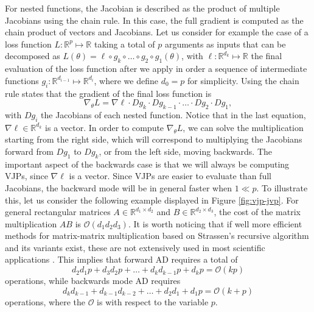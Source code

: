 For nested functions, the Jacobian is described as the product of multiple Jacobians using the chain rule.
In this case, the full gradient is computed as the chain product of vectors and Jacobians. 
Let us consider for example the case of a loss function $L : \mathbb R^p \mapsto \mathbb R$ taking a total of $p$ arguments as inputs that can be decomposed as $L(\theta) = \ell \circ g_{k} \circ \ldots \circ g_2 \circ g_1(\theta)$, with $\ell : \mathbb R^{d_k} \mapsto \mathbb R$ the final evaluation of the loss function after we apply in order a sequence of intermediate functions $g_i : \mathbb R^{d_{i-1}} \mapsto \mathbb R^{d_i}$, where we define $d_0 = p$ for simplicity. 
Using the chain rule states that the gradient of the final loss function is
\begin{equation}
 \nabla_\theta L = \nabla \ell \cdot Dg_{k} \cdot Dg_{k-1} \cdot \ldots \cdot Dg_2 \cdot Dg_1, 
\end{equation}
with $Dg_i$ the Jacobians of each nested function. 
Notice that in the last equation, $\nabla \ell \in \mathbb R^{d_k}$ is a vector.
In order to compute $\nabla_\theta L$, we can solve the multiplication starting from the right side, which will correspond to multiplying the Jacobians forward from $Dg_1$ to $Dg_k$, or from the left side, moving backwards. 
The important aspect of the backwards case is that we will always be computing VJPs, since $\nabla \ell$ is a vector.
Since VJPs are easier to evaluate than full Jacobians, the backward mode will be in general faster when $1 \ll p$.
To illustrate this, let us consider the following example displayed in Figure \ref{fig:vjp-jvp}. 
For general rectangular matrices $A\in \mathbb R^{d_1 \times d_2}$ and $B \in \mathbb R^{d_2 \times d_3}$, the cost of the matrix multiplication $AB$ is $\mathcal O (d_1 d_2 d_3)$.
It is worth noticing that if well more efficient methods for matrix-matrix multiplication based on Strassen’s recursive algorithm and its variants exist, these are not extensively used in most scientific applications \cite{Silva_Gustafson_Wong_2018, Huang_Smith_Henry_Geijn_2016}.
This implies that forward AD requires a total of
\begin{equation}
 d_2 d_1 p + d_3 d_2 p + \ldots + d_k d_{k-1} p + d_k p = \mathcal O (kp)
\end{equation}
operations, while backwards mode AD requires
\begin{equation}
 d_k d_{k-1} + d_{k-1} d_{k-2} + \ldots + d_2 d_1 + d_1 p = \mathcal O (k+p)
\end{equation}
operations, where the $\mathcal O$ is with respect to the variable $p$. 

